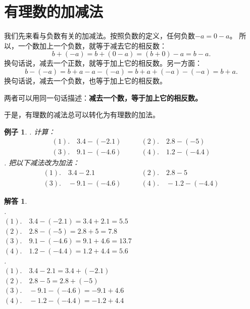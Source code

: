 \documentclass[12pt,UTF8]{ctexbook}
\newtheorem{ex}{例子}[section]
\newtheorem*{so}{解答}
\begin{document}
\section{有理数的加减法}
我们先来看与负数有关的加减法。按照负数的定义，任何负数$-a = 0 - a$。
所以，一个数加上一个负数，就等于减去它的相反数：
$$ b + (-a) = b + (0 - a) = (b + 0) - a = b - a.$$
换句话说，减去一个正数，就等于加上它的相反数。另一方面：
$$ b - (-a) = b + a - a - (-a) = b + a + (-a) - (-a) = b + a.$$
换句话说，减去一个负数，也等于加上它的相反数。

两者可以用同一句话描述：\textbf{减去一个数，等于加上它的相反数。}

\begin{center}
\end{center}

于是，有理数的减法总可以转化为有理数的加法。

\begin{ex}
    . 计算：
    $$
    \begin{array}{ll}
        (1). \quad 3.4 - (-2.1) \quad & \quad (2). \quad 2.8 - (-5) \\
        (3). \quad 9.1 - (-4.6) \quad & \quad (4). \quad 1.2 - (-4.4) 
    \end{array}
    $$
    . 把以下减法改为加法：
    $$
    \begin{array}{ll}
        (1). \quad 3.4 - 2.1 \quad & \quad (2). \quad 2.8 - 5 \\
        (3). \quad -9.1 - (-4.6) \quad & \quad (4). \quad -1.2 - (-4.4) 
    \end{array}
    $$

\end{ex}
\begin{so}
    \mbox{}\\
    . \\
    \indent $(1). \quad 3.4 - (-2.1) = 3.4 + 2.1 = 5.5$ \\
    \indent $(2). \quad 2.8 - (-5) = 2.8 + 5 = 7.8$ \\
    \indent $(3). \quad 9.1 - (-4.6) = 9.1 + 4.6 = 13.7$ \\
    \indent $(4). \quad 1.2 - (-4.4) = 1.2 + 4.4 = 5.6$ \\
    . \\
    \indent $(1). \quad 3.4 - 2.1 = 3.4 + (-2.1)$ \\
    \indent $(2). \quad 2.8 - 5 = 2.8 + (-5)$ \\
    \indent $(3). \quad -9.1 - (-4.6) = -9.1 + 4.6$ \\
    \indent $(4). \quad -1.2 - (-4.4) = -1.2 + 4.4$ 
\end{so}
\end{document}
